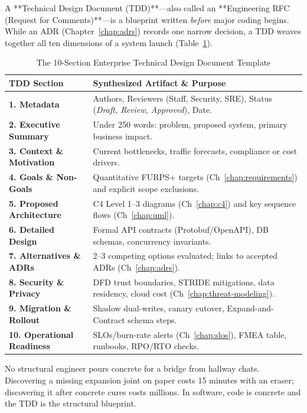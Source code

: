 A **Technical Design Document (TDD)**---also called an **Engineering RFC (Request for Comments)**---is a blueprint written \emph{before} major coding begins. While an ADR (Chapter~\ref{chap:adrs}) records one narrow decision, a TDD weaves together all ten dimensions of a system launch (Table~\ref{tab:v5-ch07-tdd-template}).

\begin{table}[htbp]
\centering\small
\begin{tabular}{lp{10.5cm}}
\toprule
\textbf{TDD Section} & \textbf{Synthesized Artifact \& Purpose} \\
\midrule
\textbf{1. Metadata} & Authors, Reviewers (Staff, Security, SRE), Status (\textit{Draft, Review, Approved}), Date. \\
\textbf{2. Executive Summary} & Under 250 words: problem, proposed system, primary business impact. \\
\textbf{3. Context \& Motivation} & Current bottlenecks, traffic forecasts, compliance or cost drivers. \\
\textbf{4. Goals \& Non-Goals} & Quantitative FURPS+ targets (Ch~\ref{chap:requirements}) and explicit scope exclusions. \\
\textbf{5. Proposed Architecture} & C4 Level 1--3 diagrams (Ch~\ref{chap:c4}) and key sequence flows (Ch~\ref{chap:uml}). \\
\textbf{6. Detailed Design} & Formal API contracts (Protobuf/OpenAPI), DB schemas, concurrency invariants. \\
\textbf{7. Alternatives \& ADRs} & 2--3 competing options evaluated; links to accepted ADRs (Ch~\ref{chap:adrs}). \\
\textbf{8. Security \& Privacy} & DFD trust boundaries, STRIDE mitigations, data residency, cloud cost (Ch~\ref{chap:threat-modeling}). \\
\textbf{9. Migration \& Rollout} & Shadow dual-writes, canary cutover, Expand-and-Contract schema steps. \\
\textbf{10. Operational Readiness} & SLOs/burn-rate alerts (Ch~\ref{chap:slos}), FMEA table, runbooks, RPO/RTO checks. \\
\bottomrule
\end{tabular}
\caption{The 10-Section Enterprise Technical Design Document Template}
\label{tab:v5-ch07-tdd-template}
\end{table}

\begin{intuitionbox}
No structural engineer pours concrete for a bridge from hallway chats. Discovering a missing expansion joint on paper costs 15 minutes with an eraser; discovering it after concrete cures costs millions. In software, code is concrete and the TDD is the structural blueprint.
\end{intuitionbox}

